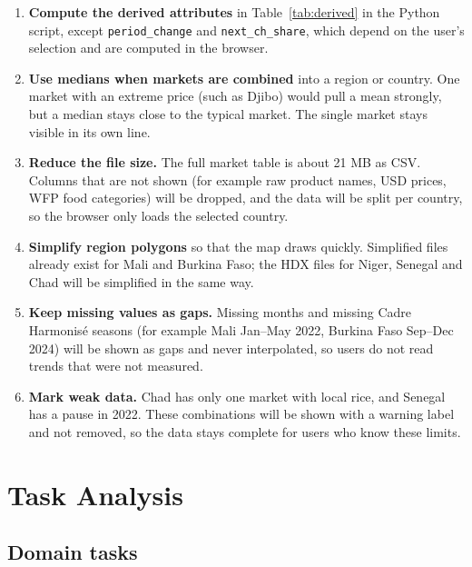 \documentclass{article}
\begin{document}
\begin{enumerate}
  \item \textbf{Compute the derived attributes} in Table~\ref{tab:derived} in the Python script, except \texttt{period\_change} and \texttt{next\_ch\_share}, which depend on the user's selection and are computed in the browser.
  \item \textbf{Use medians when markets are combined} into a region or country. One market with an extreme price (such as Djibo) would pull a mean strongly, but a median stays close to the typical market. The single market stays visible in its own line.
  \item \textbf{Reduce the file size.} The full market table is about 21 MB as CSV. Columns that are not shown (for example raw product names, USD prices, WFP food categories) will be dropped, and the data will be split per country, so the browser only loads the selected country.
  \item \textbf{Simplify region polygons} so that the map draws quickly. Simplified files already exist for Mali and Burkina Faso; the HDX files for Niger, Senegal and Chad will be simplified in the same way.
  \item \textbf{Keep missing values as gaps.} Missing months and missing Cadre Harmonis\'e seasons (for example Mali Jan--May 2022, Burkina Faso Sep--Dec 2024) will be shown as gaps and never interpolated, so users do not read trends that were not measured.
  \item \textbf{Mark weak data.} Chad has only one market with local rice, and Senegal has a pause in 2022. These combinations will be shown with a warning label and not removed, so the data stays complete for users who know these limits.
\end{enumerate}

\section{Task Analysis}

\subsection{Domain tasks}
\end{document}
